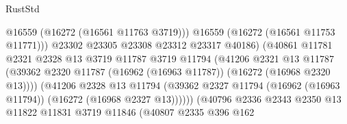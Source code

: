 \begin{lexlean}{RustStd}
\begin{coremodule}
                                              @16559
                                              (@16272 (@16561 @11763 @3719)))
                                            @16559
                                            (@16272 (@16561 @11753 @11771)))
                                          @23302
                                          @23305
                                          @23308
                                          @23312
                                          @23317
                                          @40186)
                                        (@40861
                                          @11781
                                          @2321
                                          @2328
                                          @13
                                          @3719
                                          @11787
                                          @3719
                                          @11794
                                          (@41206
                                            @2321
                                            @13
                                            @11787
                                            (@39362
                                              @2320
                                              @11787
                                              (@16962 (@16963 @11787))
                                              (@16272 (@16968 @2320 @13))))
                                          (@41206
                                            @2328
                                            @13
                                            @11794
                                            (@39362
                                              @2327
                                              @11794
                                              (@16962 (@16963 @11794))
                                              (@16272 (@16968 @2327 @13))))))
                                      (@40796
                                        @2336
                                        @2343
                                        @2350
                                        @13
                                        @11822
                                        @11831
                                        @3719
                                        @11846
                                        (@40807
                                          @2335
                                          @396
                                          @162

\end{coremodule}
\end{lexlean}
